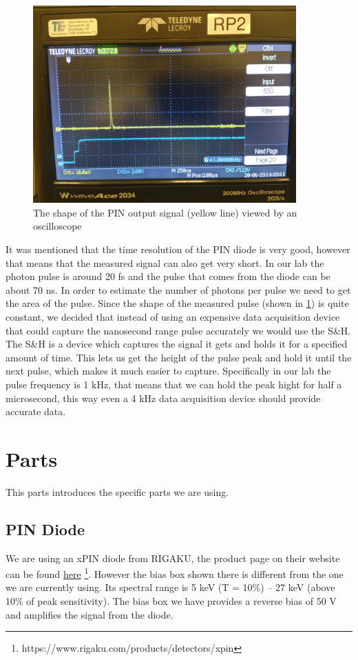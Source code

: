 \documentclass[a4paper, 10pt]{article}
\begin{document}
\begin{figure}[h]
    \centering
    \includegraphics[width=0.9\textwidth]{../images/pulse-shape.jpg}
    \caption{The shape of the PIN output signal (yellow line) viewed by an oscilloscope}
    \label{fig:pulse-shape}
\end{figure}

It was mentioned that the time resolution of the PIN diode is very good, however that means that the measured signal can also get very short.
In our lab the photon pulse is around 20 \si{\femto\second} and the pulse that comes from the diode can be about 70 \si{\nano\second}.
In order to estimate the number of photons per pulse we need to get the area of the pulse.
Since the shape of the measured pulse (shown in \cref{fig:pulse-shape}) is quite constant, we decided that instead of using an expensive data acquisition device that could capture the nanosecond range pulse accurately we would use the S\&H.
The S\&H is a device which captures the signal it gets and holds it for a specified amount of time.
This lets us get the height of the pulse peak and hold it until the next pulse, which makes it much easier to capture.
Specifically in our lab the pulse frequency is 1 \si{\kilo\hertz}, that means that we can hold the peak hight for half a microsecond, this way even a 4 \si{\kilo\hertz} data acquisition device should provide accurate data.


\section{Parts}
This parts introduces the specific parts we are using.

\subsection{PIN Diode}
We are using an xPIN diode from RIGAKU, the product page on their website can be found \href{https://www.rigaku.com/products/detectors/xpin}{here} \footnote{https://www.rigaku.com/products/detectors/xpin}.
However the bias box shown there is different from the one we are currently using.
Its spectral range is 5 \si{\kilo\electronvolt} (T = 10\%) – 27 \si{\kilo\electronvolt} (above 10\% of peak sensitivity).
The bias box we have provides a reverse bias of 50 \si{\volt} and amplifies the signal from the diode.
\end{document}
